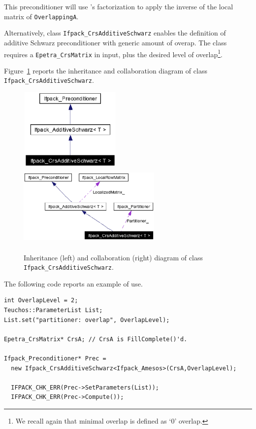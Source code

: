 This preconditioner will use \amesos's factorization to apply the inverse of
the local matrix of \verb!OverlappingA!.

\smallskip

Alternatively, class \verb!Ifpack_CrsAdditiveSchwarz! 
enables the definition of additive
Schwarz preconditioner with generic amount of overap. The class requires a
\verb!Epetra_CrsMatrix! in input, plus the desired level of
overlap\footnote{We recall again that minimal overlap is defined as `0' overlap.}. 

Figure~\ref{fig:uml_additive} reports the inheritance and collaboration
diagram of class \verb!Ifpack_CrsAdditiveSchwarz!.

\begin{figure}
\begin{center}
\includegraphics[width=5cm,height=4cm]{CrsAdditiveSchwarz_Inheritance.eps}
\hspace*{1cm}
\includegraphics[width=7cm,height=4cm]{CrsAdditiveSchwarz_Collaboration.eps}
\caption{Inheritance (left) and collaboration (right) diagram of class
  {\tt Ifpack\_CrsAdditiveSchwarz}.}
  \label{fig:uml_additive}
\end{center}
\end{figure}

The following code reports an example of use.
\begin{verbatim}
int OverlapLevel = 2;
Teuchos::ParameterList List;
List.set("partitioner: overlap", OverlapLevel);

Epetra_CrsMatrix* CrsA; // CrsA is FillComplete()'d.

Ifpack_Preconditioner* Prec =
  new Ifpack_CrsAdditiveSchwarz<Ifpack_Amesos>(CrsA,OverlapLevel);

  IFPACK_CHK_ERR(Prec->SetParameters(List));
  IFPACK_CHK_ERR(Prec->Compute());
\end{verbatim}

